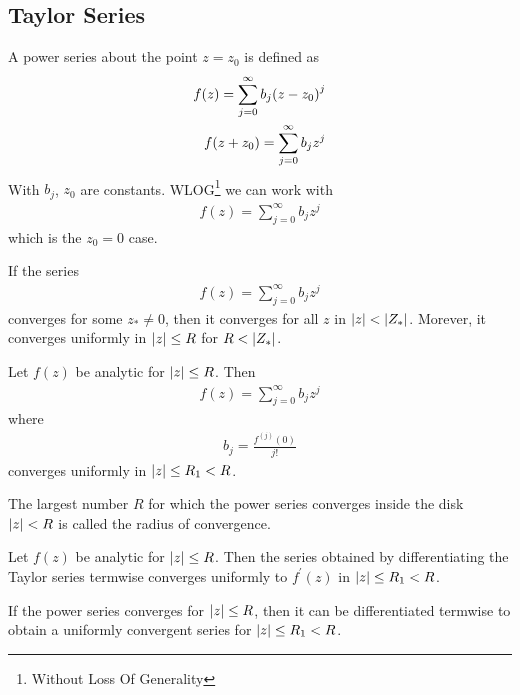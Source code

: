     \subsection{Taylor Series}
    A power series about the point $z=z_0$ is defined as
    \begin{align*}
        f(z) = \sum_{j=0}^\infty b_j {\left( z - z_0 \right)}^j\\
        f(z+z_0) = \sum_{j=0}^\infty b_j z^j
    \end{align*}
    With $b_j$, $z_0$ are constants. WLOG\footnote{Without Loss Of
    Generality} we can work with
    \begin{align*}
        f(z) = \sum_{j=0}^\infty b_j z^j
    \end{align*}
    which is the $z_0 = 0$ case.
    \begin{thm}
        If the series
        \begin{align*}
            f(z) = \sum_{j=0}^\infty b_j z^j
        \end{align*}
        converges for some $z_* \neq 0$, then it converges for all $z$ in
        $\left\lvert z \right\rvert < \left\lvert Z_* \right\rvert$. Morever, it converges uniformly in $\left\lvert z \right\rvert
        \le R$ for $R < \left\lvert Z_* \right\rvert$.
    \end{thm}
    \begin{thm}
        Let $f(z)$ be analytic for $\left\lvert z \right\rvert \le R$. Then
        \begin{align*}
            f(z) = \sum_{j=0}^\infty b_j z^j
        \end{align*}
        where
        \begin{align*}
            b_j = \frac{f^{(j)}(0)}{j!}
        \end{align*}
        converges uniformly in $\left\lvert z \right\rvert \le R_1 < R$.
    \end{thm}

    The largest number $R$ for which the power series converges inside the
    disk $\left\lvert z \right\rvert < R$ is called the radius of convergence.

    \begin{thm}
        Let $f(z)$ be analytic for $\left\lvert z \right\rvert \le R$. Then the series obtained
        by differentiating the Taylor series termwise converges uniformly to
        $f^\prime(z)$ in $\left\lvert z \right\rvert \le R_1 < R$.
    \end{thm}

    \begin{thm}
        If the power series converges for $\left\lvert z \right\rvert \le R$, then it can be
        differentiated termwise to obtain a uniformly convergent series for
        $\left\lvert z \right\rvert \le R_1 < R$.
    \end{thm}

